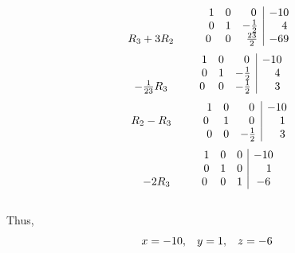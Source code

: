 \documentclass[12pt]{amsart}
\begin{document}
\begin{enumerate}
\begin{enumerate}
\begin{align}
			\end{align} 
			\smallskip
			\begin{align}
				\begin{array}{ccc|c}
					\hspace{2.65cm}1&0&\text{ } \text{ }0&-10 \\
					\hspace{2.65cm} 0&1&-\frac{1}{2}& \text{ } \text{ } \text{ }4 \\
					R_3+3R_2 \hspace{1cm}0&0&\text{ }\frac{23}{2}&-69
				\end{array} \notag
			\end{align} 
			\smallskip
			\begin{align}
				\begin{array}{ccc|c}
					\hspace{2.2cm}1&0&\text{ } \text{ }0&-10 \\
					\hspace{2.2cm} 0&1&-\frac{1}{2}& \text{ } \text{ } \text{ }4 \\
					-\frac{1}{23}R_3 \hspace{1cm}0&0&-\frac{1}{2}&\text{ } \text{ } \text{ }3
				\end{array} \notag
			\end{align} 
			\smallskip
			\begin{align}
				\begin{array}{ccc|c}
					\hspace{2.5cm}1&0&\text{ } \text{ }0&-10 \\
					R_2-R_3\hspace{1cm} 0&1&\text{ } \text{ }0& \text{ } \text{ } \text{ }1 \\
					\hspace{2.5cm}0&0&-\frac{1}{2}&\text{ } \text{ } \text{ }3
				\end{array} \notag
			\end{align} 
			\smallskip
			\begin{align}
				\begin{array}{ccc|c}
					\hspace{2cm}1&0&0&-10 \\
					\hspace{2cm} 0&1&0& \text{ } \text{ } \text{ }1 \\
					-2R_3\hspace{1cm}0&0&1&-6
				\end{array} \notag
			\end{align} 
			\\
			Thus, $$x=-10, \hspace{0.3cm} y=1, \hspace{0.3cm} z=-6$$
			

\end{enumerate}
\end{enumerate}
\end{document}
